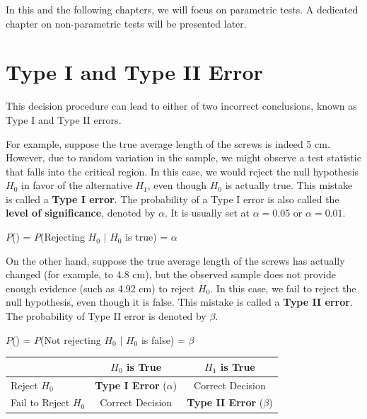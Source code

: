 \documentclass[twoside]{book}
\begin{document}
In this and the following chapters, we will focus on parametric tests. A dedicated chapter on non-parametric tests will be presented later.


\section{Type I and Type II Error}
This decision procedure can lead to either of two incorrect conclusions, known as Type I and Type II errors.

For example, suppose the true average length of the screws is indeed 5 cm. However, due to random variation in the sample, we might observe a test statistic that falls into the critical region. In this case, we would reject the null hypothesis $H_0$ in favor of the alternative $H_1$, even though $H_0$ is actually true. This mistake is called a \textbf{Type I error}. The probability of a Type I error is also called the \textbf{level of significance}, denoted by $\alpha$. It is usually set at $\alpha = 0.05$ or $\alpha = 0.01$.

\begin{textbox}
	\centering $P$()  = $P$(Rejecting $H_0$ $\mid$ $H_0$ is true) = $\alpha$
\end{textbox}

On the other hand, suppose the true average length of the screws has actually changed (for example, to 4.8 cm), but the observed sample does not provide enough evidence (such as 4.92 cm) to reject $H_0$. In this case, we fail to reject the null hypothesis, even though it is false. This mistake is called a \textbf{Type II error}. The probability of Type II error is denoted by $\beta$.

\begin{textbox}
	\centering $P$() = $P$(Not rejecting $H_0$ $\mid$ $H_0$ is false) = $\beta$
\end{textbox}

\begin{table}[H]
	\centering
	\vspace{0.5em}
	\renewcommand{\arraystretch}{1.5}
	\begin{tabular}{l|c|c}

		& $H_0$ is True & $H_1$ is True \\
		\midrule
		Reject $H_0$        & \textbf{Type I Error} ($\alpha$) & Correct Decision \\
		Fail to Reject $H_0$ & Correct Decision        & \textbf{Type II Error} ($\beta$) \\
	\end{tabular}
\end{table}
\end{document}
